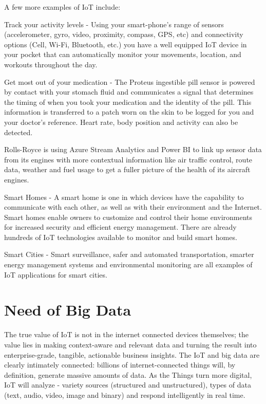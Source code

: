 \documentclass[sigconf]{acmart}
\begin{document}
A few more examples of IoT include:

Track your activity levels - Using your smart-phone's range of sensors (accelerometer, gyro, video, proximity, compass, GPS, etc) and connectivity options (Cell, Wi-Fi, Bluetooth, etc.) you have a well equipped IoT device in your pocket that can automatically monitor your movements, location, and workouts throughout the day.

Get most out of your medication - The Proteus ingestible pill sensor is powered by contact with your stomach fluid and communicates a signal that determines the timing of when you took your medication and the identity of the pill. This information is transferred to a patch worn on the skin to be logged for you and your doctor's reference. Heart rate, body position and activity can also be detected.

Rolls-Royce is using Azure Stream Analytics and Power BI to link up sensor data from its engines with more contextual information like air traffic control, route data, weather and fuel usage to get a fuller picture of the health of its aircraft engines.

Smart Homes - A smart home is one in which devices have the capability to communicate with each other, as well as with their environment and the Internet. Smart homes enable owners to customize and control their home environments for increased security and efficient energy management. There are already hundreds of IoT technologies available to monitor and build smart homes.

Smart Cities - Smart surveillance, safer and automated transportation, smarter energy management systems and environmental monitoring are all examples of IoT applications for smart cities.

\section{Need of Big Data}

The true value of IoT is not in the internet connected devices themselves; the value lies in making context-aware and relevant data and turning the result into enterprise-grade, tangible, actionable business insights. The IoT and big data are clearly intimately connected: billions of internet-connected things will, by definition, generate massive amounts of data. As the Things turn more digital, IoT will analyze - variety sources (structured and unstructured), types of data (text, audio, video, image and binary) and respond intelligently in real time. 
\end{document}
